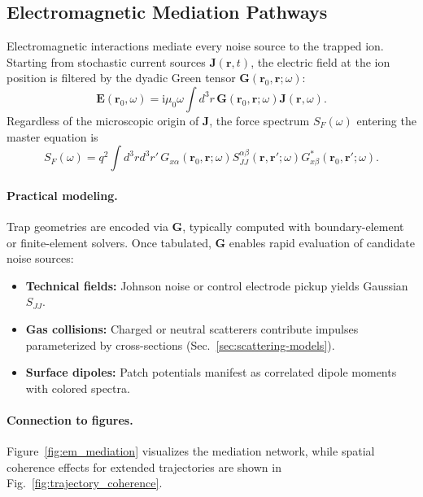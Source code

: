 \subsection{Electromagnetic Mediation Pathways}
Electromagnetic interactions mediate every noise source to the trapped ion.
Starting from stochastic current sources $\mathbf{J}(\mathbf{r},t)$, the electric field at the ion position is filtered by the dyadic Green tensor $\mathbf{G}(\mathbf{r}_0,\mathbf{r};\omega)$:
\begin{equation}
\mathbf{E}(\mathbf{r}_0,\omega) = \mathrm{i}\mu_0\omega \int d^3 r\, \mathbf{G}(\mathbf{r}_0,\mathbf{r};\omega) \mathbf{J}(\mathbf{r},\omega).
\end{equation}
Regardless of the microscopic origin of $\mathbf{J}$, the force spectrum $S_F(\omega)$ entering the master equation is
\begin{equation}
S_F(\omega) = q^2 \int d^3 r d^3 r'\, G_{x\alpha}(\mathbf{r}_0,\mathbf{r};\omega) S_{JJ}^{\alpha\beta}(\mathbf{r},\mathbf{r}';\omega) G^{*}_{x\beta}(\mathbf{r}_0,\mathbf{r}';\omega).
\end{equation}

\paragraph{Practical modeling.}
Trap geometries are encoded via $\mathbf{G}$, typically computed with boundary-element or finite-element solvers.
Once tabulated, $\mathbf{G}$ enables rapid evaluation of candidate noise sources:
\begin{itemize}
  \item \textbf{Technical fields:} Johnson noise or control electrode pickup yields Gaussian $S_{JJ}$.
  \item \textbf{Gas collisions:} Charged or neutral scatterers contribute impulses parameterized by cross-sections (Sec.~\ref{sec:scattering-models}).
  \item \textbf{Surface dipoles:} Patch potentials manifest as correlated dipole moments with colored spectra.
\end{itemize}

\paragraph{Connection to figures.}
Figure~\ref{fig:em_mediation} visualizes the mediation network, while spatial coherence effects for extended trajectories are shown in Fig.~\ref{fig:trajectory_coherence}.

